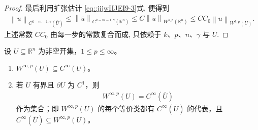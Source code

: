 \documentclass[../../main.tex]{subfiles}
\begin{document}
\begin{proof}
最后利用扩张估计 \eqref{eq::jijwIIJEI9-3}式, 便得到
\begin{align*}
\left\| u \right\| _{C^{k-m-1,\gamma}(\overline{U})}\leqslant \left\| \overline{u} \right\| _{C^{k-m-1,\gamma}(\mathbb{R} ^n)}\leqslant C\left\| \overline{u} \right\| _{W^{k,p}(\mathbb{R} ^n)}\leqslant CC_0\left\| u \right\| _{W^{k,p}(U)}.
\end{align*}
上述常数 $CC_0$ 由每一步的常数复合而成, 只依赖于 $k$、$p$、$n$、$\gamma$ 与 $U$.
\end{proof}

\begin{theorem}\label{theorem:ch05-Winfty光滑性}
设 $U\subseteq\mathbb{R}^n$ 为非空开集，$1\leqslant p\leqslant\infty$。
\begin{enumerate}[(1)]
\item $W^{\infty,p}(U)\subseteq C^\infty(U)$。

\item 若 $U$ 有界且 $\partial U$ 为 $C^1$，则
\begin{align*}
W^{\infty,p}(U)=C^\infty(\overline U)
\end{align*}
作为集合；即 $W^{\infty,p}(U)$ 的每个等价类都有 $C^\infty(\overline U)$ 的代表，且 $C^\infty(\overline U)\subseteq W^{\infty,p}(U)$。
\end{enumerate}
\end{theorem}
\end{document}
